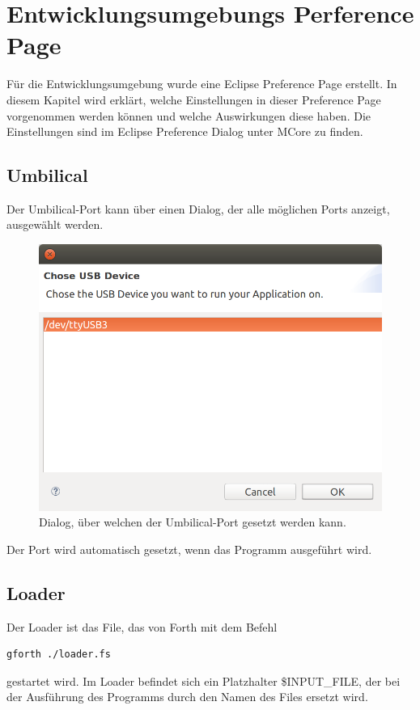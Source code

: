 \chapter{Entwicklungsumgebungs Perference Page}
\label{chap:settings}
Für die Entwicklungsumgebung wurde eine Eclipse Preference Page erstellt. In diesem Kapitel wird erklärt, welche Einstellungen in dieser Preference Page vorgenommen werden können und welche Auswirkungen diese haben. Die Einstellungen sind im Eclipse Preference Dialog unter MCore zu finden.
\section{Umbilical}

Der Umbilical-Port kann über einen Dialog, der alle möglichen Ports anzeigt, ausgewählt werden.

\begin{figure}[H]
	\centering
		\includegraphics[scale=0.3]{idesettings/umbilical.png}
		\caption{Dialog, über welchen der Umbilical-Port gesetzt werden kann.}
		\label{fig:umbilicalport}
\end{figure}

Der Port wird automatisch gesetzt, wenn das Programm ausgeführt wird. 

\section{Loader}

Der Loader ist das File, das von Forth mit dem Befehl
%
\begin{verbatim}
gforth ./loader.fs
\end{verbatim}
%
gestartet wird. Im Loader befindet sich ein Platzhalter \$INPUT\_FILE, der bei der Ausführung des Programms durch den Namen des Files ersetzt wird.